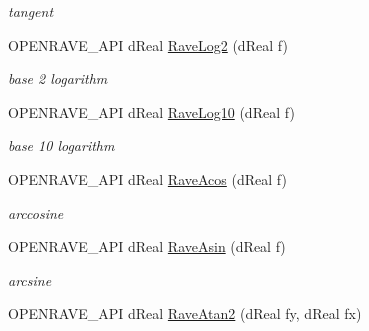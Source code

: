\begin{Indent}{\bf }
\begin{DoxyCompactItemize}
\begin{DoxyCompactList}\small\item\em tangent \item\end{DoxyCompactList}\item 
\hypertarget{group__affine__math_gaaa147e7be9eb0e01250291e2aa3a81bf}{
OPENRAVE\_\-API dReal \hyperlink{group__affine__math_gaaa147e7be9eb0e01250291e2aa3a81bf}{RaveLog2} (dReal f)}
\label{group__affine__math_gaaa147e7be9eb0e01250291e2aa3a81bf}

\begin{DoxyCompactList}\small\item\em base 2 logarithm \item\end{DoxyCompactList}\item 
\hypertarget{group__affine__math_gab7abc4771e520f8baa20554f4c6d12c2}{
OPENRAVE\_\-API dReal \hyperlink{group__affine__math_gab7abc4771e520f8baa20554f4c6d12c2}{RaveLog10} (dReal f)}
\label{group__affine__math_gab7abc4771e520f8baa20554f4c6d12c2}

\begin{DoxyCompactList}\small\item\em base 10 logarithm \item\end{DoxyCompactList}\item 
\hypertarget{group__affine__math_ga97b4b78434f3e9b0b57cbd9d7b4b6610}{
OPENRAVE\_\-API dReal \hyperlink{group__affine__math_ga97b4b78434f3e9b0b57cbd9d7b4b6610}{RaveAcos} (dReal f)}
\label{group__affine__math_ga97b4b78434f3e9b0b57cbd9d7b4b6610}

\begin{DoxyCompactList}\small\item\em arccosine \item\end{DoxyCompactList}\item 
\hypertarget{group__affine__math_gabae52eb1a8ad7fc3bc90da48a4718941}{
OPENRAVE\_\-API dReal \hyperlink{group__affine__math_gabae52eb1a8ad7fc3bc90da48a4718941}{RaveAsin} (dReal f)}
\label{group__affine__math_gabae52eb1a8ad7fc3bc90da48a4718941}

\begin{DoxyCompactList}\small\item\em arcsine \item\end{DoxyCompactList}\item 
\hypertarget{group__affine__math_ga5099467e8cef4035d8e2ee264c9e312b}{
OPENRAVE\_\-API dReal \hyperlink{group__affine__math_ga5099467e8cef4035d8e2ee264c9e312b}{RaveAtan2} (dReal fy, dReal fx)}
\label{group__affine__math_ga5099467e8cef4035d8e2ee264c9e312b}


\end{DoxyCompactItemize}
\end{Indent}
